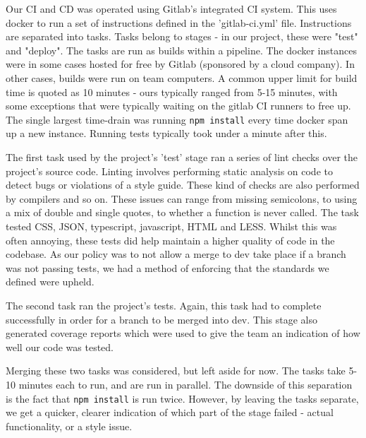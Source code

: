 \documentclass{l3proj}
\begin{document}
Our CI and CD was operated using Gitlab's integrated CI system. This uses docker to
 run a set of instructions defined in the 'gitlab-ci.yml' file.  Instructions are 
 separated into tasks. Tasks belong to stages - in our project, these were
 "test" and "deploy". The tasks are run as builds within a pipeline. The docker instances were
 in some cases hosted for free by Gitlab (sponsored by a cloud company). In other cases,
 builds were run on team computers. A common upper limit for build time is quoted as 
 10 minutes\cite{fowler2006continuous} - ours typically ranged from 5-15 minutes, with some exceptions that were 
 typically waiting on the gitlab CI runners to free up. The single largest time-drain was
 running \texttt{npm install} every time docker span up a new instance. Running tests typically took under
 a minute after this.
 
 


The first task used by the project's 'test' stage ran a series of lint checks over the 
 project's source code. Linting involves performing static analysis on code to detect bugs 
 or violations of a style guide. These kind of checks are also performed by compilers and 
 so on. These issues can range from missing semicolons, to using a mix of 
 double and single quotes, to whether a function is never called. The task tested CSS, 
 JSON, typescript, javascript,  HTML and LESS. Whilst this was often annoying, these tests 
 did help maintain a higher quality of code in the codebase. As our policy was to not allow a 
 merge to dev take place if a branch was not passing tests, we had a method of 
 enforcing that the standards we defined were upheld.

The second task ran the project's tests. Again, this task had to complete successfully in 
 order for a branch to be merged into dev. This stage also generated coverage reports which 
 were used to give the team an indication of how well our code was tested.
 
 
 
Merging these two tasks was considered, but left aside for now. The tasks take 5-10 minutes 
 each to run, and are run in parallel. The downside of this separation is the fact that \texttt{npm install} 
 is run twice. However, by leaving the tasks separate, we get a quicker, clearer indication
 of which part of the stage failed - actual functionality, or a style issue.
\end{document}
